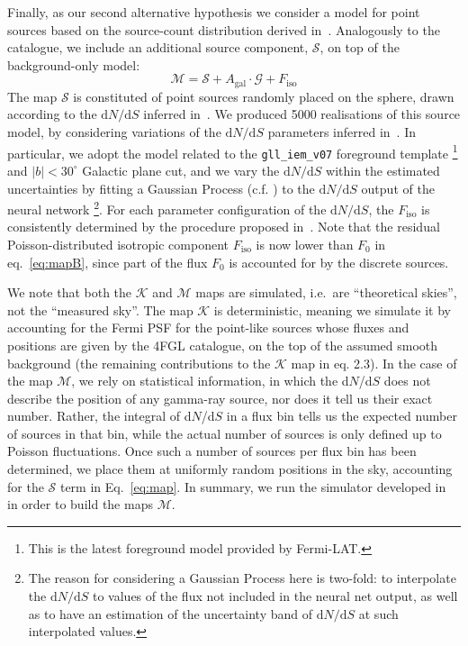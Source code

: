 \documentclass{article}
\def\dNdS{\textrm{d}N/\textrm{d}S}
\begin{document}
\medskip
Finally,  as our second alternative hypothesis we consider a model for point sources based on the source-count distribution 
derived in~\cite{Amerio:2023uet}.
%
Analogously to the catalogue, we include an additional source component, $\mathcal{S}$, on top of the background-only model:
\begin{equation}
    \mathcal{M} = \mathcal{S} + A_\textrm{gal}\cdot\mathcal{G} + F_\textrm{iso}
    \label{eq:map}
\end{equation}
The map $\mathcal{S}$ is constituted of point sources randomly placed  on the sphere, drawn according to the $\dNdS$ inferred in~\cite{Amerio:2023uet}. 
We produced 5000 realisations of this source model, by considering variations of the 
$\dNdS$ parameters inferred in~\cite{Amerio:2023uet}. In particular, we adopt the model related to the \verb|gll_iem_v07| foreground template \footnote{This is the latest foreground model provided by Fermi-LAT.} and $|b|<30^\circ$ Galactic plane cut, and we vary the $\dNdS$ within the estimated uncertainties by fitting a Gaussian Process (c.f.  \cite{Rasmussen2005}) to the $\dNdS$  output of the neural network \footnote{The reason for considering a Gaussian Process here is two-fold: to interpolate the $\dNdS$ to values of the flux not included in the neural net output, as well as to have an estimation of the uncertainty band of $\dNdS$ at such interpolated values. }. 
For each parameter configuration of the $\dNdS$, the $F_\textrm{iso}$ is consistently determined by the procedure proposed in~\cite{Amerio:2023uet}.
Note that the residual Poisson-distributed isotropic component $F_\textrm{iso}$  is now lower than  $F_0$ in eq.~\eqref{eq:mapB}, since part of the flux $F_0$ is accounted for by the discrete sources. 

We note that both the $\mathcal{K}$ and $\mathcal{M}$ maps are simulated, i.e.~are ``theoretical skies'', not the ``measured sky''. The map $\mathcal{K}$ is deterministic, meaning we  simulate it by accounting for the Fermi PSF for the point-like sources whose fluxes and positions are given by the 4FGL catalogue, on the top of the assumed smooth background (the remaining contributions to the $\mathcal{K}$ map in eq. 2.3). In the case of the map $\mathcal{M}$, we rely on statistical information, in which the d$N$/d$S$ does not describe the position of any gamma-ray source, nor does it tell us their exact number. Rather, the integral of d$N$/d$S$ in a flux bin tells us the expected number of sources in that bin, while the actual number of sources is only defined up to Poisson fluctuations. Once such a number of sources per flux bin has been determined, we place them at uniformly random positions in the sky, accounting for the $\mathcal{S}$ term in Eq.~\eqref{eq:map}. In summary, we run the simulator developed in~\cite{Amerio:2023uet} in order to build the maps $\mathcal{M}$.
\end{document}

